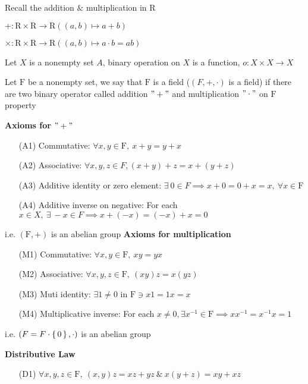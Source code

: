 Recall the addition $\&$ multiplication in $\mathrm{R}$

$+ : \mathrm{R} \times \mathrm{R} \rightarrow \mathrm{R}((a,b)\mapsto a+b)$

$\times : \mathrm{R} \times \mathrm{R} \rightarrow \mathrm{R}((a,b)\mapsto a \cdot b = ab)$

\begin{defn}
	Let $X$ is a nonempty set $A$, binary operation on $X$ is a function, $o:X\times X \rightarrow X$
\end{defn}


\begin{defn}
	Let $\mathrm{F}$ be a nonempty set, we say that $\mathrm{F}$ is a field ($(F,+,\cdot)$ is a field) if there are two binary operator called addition $"+"$ and multiplication $"\cdot"$ on $\mathrm{F}$ property
	
	\begin{tcolorbox}
		\textbf{Axioms for $"+"$}
		\begin{enumerate}
			\item[(A1)] Commutative: $\forall x,y \in \mathrm{F},~x+y=y+x$
			\item[(A2)] Associative: $\forall x,y,z \in F, (x+y)+z = x+(y+z)$
			\item[(A3)] Additive identity or zero element: $\exists~ 0 \in F \implies x + 0 = 0 + x = x ,~\forall x \in \mathrm{F}$
			\item[(A4)] Additive inverse on negative: For each $x \in X,~ \exists~-x \in F \implies x + (-x) = (-x) + x = 0$
		\end{enumerate}
		i.e. $(\mathrm{F},+)$ is an abelian group
		\textbf{Axioms for multiplication}
		\begin{enumerate}
			\item[(M1)] Commutative: $\forall x,y \in \mathrm{F},~xy=yx$
			\item[(M2)] Associative: $\forall x,y,z \in \mathrm{F},~(xy)z = x(yz)$
			\item[(M3)] Muti identity: $\exists 1 \neq 0$ in $\mathrm{F} \ni x1 = 1x = x$
			\item[(M4)] Multiplicative inverse: For each $x \neq 0, \exists x^{-1} \in \mathrm{F} \implies xx^{-1} = x^{-1}x = 1$
		\end{enumerate}
		i.e. $(F = F\cdot \left\{ \,0 \,\right\},\cdot)$ is an abelian group
	
		\textbf{Distributive Law}
		\begin{enumerate}
			\item[(D1)] $\forall x,y,z \in \mathrm{F},~(x,y)z = xz+yz ~\&~ x(y+z) = xy+xz$
		\end{enumerate}
	\end{tcolorbox}
	
	
	
	
\end{defn}

